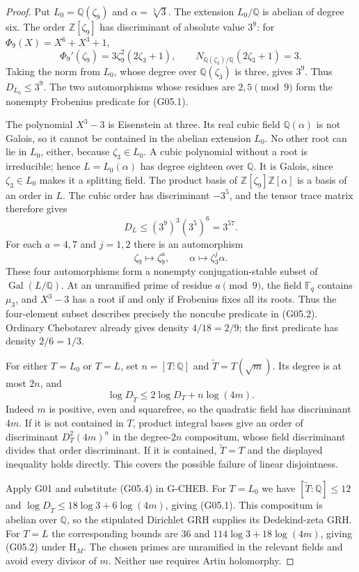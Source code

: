 \documentclass[11pt,a4paper]{article}
\begin{document}
\begin{proof}
Put $L_0=\mathbb Q(\zeta_9)$ and $\alpha=\sqrt[3]{3}$.  The extension
$L_0/\mathbb Q$ is abelian of degree six.  The order
$\mathbb Z[\zeta_9]$ has discriminant of absolute value $3^9$:
for $\Phi_9(X)=X^6+X^3+1$,
\[
 \Phi_9'(\zeta_9)=3\zeta_9^2(2\zeta_3+1),\qquad
 N_{\mathbb Q(\zeta_3)/\mathbb Q}(2\zeta_3+1)=3.
\]
Taking the norm from $L_0$, whose degree over $\mathbb Q(\zeta_3)$ is
three, gives $3^9$.  Thus $D_{L_0}\le3^9$.  The two automorphisms
whose residues are $2,5\pmod9$ form the nonempty Frobenius predicate
for (G05.1).

The polynomial $X^3-3$ is Eisenstein at three.  Its real cubic field
$\mathbb Q(\alpha)$ is not Galois, so it cannot be contained in the
abelian extension $L_0$.  No other root can lie in $L_0$, either,
because $\zeta_3\in L_0$.  A cubic polynomial without a root is
irreducible; hence $L=L_0(\alpha)$ has degree eighteen over
$\mathbb Q$.  It is Galois, since $\zeta_3\in L_0$ makes it a
splitting field.  The product basis of
$\mathbb Z[\zeta_9]\mathbb Z[\alpha]$ is a basis of an order in $L$.
The cubic order has discriminant $-3^5$, and the tensor trace matrix
therefore gives
\[
 D_L\le (3^9)^3(3^5)^6=3^{57}. \tag{G05.3}
\]
For each $a=4,7$ and $j=1,2$ there is an automorphism
\[
 \zeta_9\longmapsto\zeta_9^a,\qquad
 \alpha\longmapsto\zeta_3^j\alpha.
\]
These four automorphisms form a nonempty conjugation-stable subset
of $\operatorname{Gal}(L/\mathbb Q)$.  At an unramified prime of residue
$a\pmod9$, the field $\mathbb F_q$ contains $\mu_3$, and $X^3-3$
has a root if and only if Frobenius fixes all its roots.  Thus the
four-element subset describes precisely the noncube predicate in
(G05.2).  Ordinary Chebotarev already gives density $4/18=2/9$;
the first predicate has density $2/6=1/3$.

For either $T=L_0$ or $T=L$, set $n=[T:\mathbb Q]$ and
$\widetilde T=T(\sqrt m)$.  Its degree is at most $2n$, and
\[
 \log D_{\widetilde T}\le2\log D_T+n\log(4m). \tag{G05.4}
\]
Indeed $m$ is positive, even and squarefree, so the quadratic field
has discriminant $4m$.  If it is not contained in $T$, product integral
bases give an order of discriminant $D_T^2(4m)^n$ in the degree-$2n$
compositum, whose field discriminant divides that order discriminant.
If it is contained, $\widetilde T=T$ and the displayed inequality
holds directly.  This covers the possible failure of linear disjointness.

Apply G01 and substitute (G05.4) in G-CHEB.  For $T=L_0$ we have
$[\widetilde T:\mathbb Q]\le12$ and
$\log D_{\widetilde T}\le18\log3+6\log(4m)$, giving (G05.1).
This compositum is abelian over $\mathbb Q$, so the stipulated
Dirichlet GRH supplies its Dedekind-zeta GRH.  For $T=L$ the
corresponding bounds are $36$ and $114\log3+18\log(4m)$, giving
(G05.2) under $\mathrm H_M$.  The chosen primes are unramified in
the relevant fields and avoid every divisor of $m$.  Neither use
requires Artin holomorphy.
\end{proof}
\end{document}
